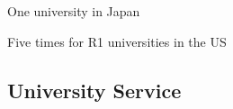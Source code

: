 \documentclass[11pt,letter]{article}
\renewenvironment{itemize}{
  \begin{list}{}{
    \setlength{\leftmargin}{1.5em}
    \setlength{\itemsep}{0.25em}
    \setlength{\parskip}{0pt}
    \setlength{\parsep}{0.25em}
  }
}{
  \end{list}
}
\begin{document}
\begin{itemize}

\item One university in Japan


\item Five times for R1 universities in the US








\end{itemize}

\subsection*{\bf \normalsize University Service}
\end{document}
